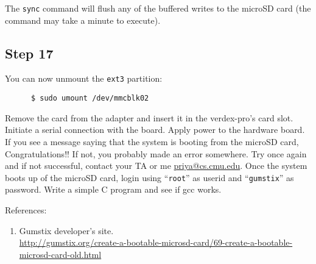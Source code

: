 \documentclass{article}
\begin{document}
      The \texttt{sync} command will flush any of the buffered writes to the
      microSD card (the command may take a minute to execute).
   \subsection*{Step 17}
      You can now unmount the \texttt{ext3} partition: 
      \begin{verbatim}
      $ sudo umount /dev/mmcblk02 
      \end{verbatim}

      Remove the card from the adapter and insert it in the verdex-pro’s card
      slot. Initiate a serial connection with the board. Apply power to the
      hardware board. If you see a message saying that the system is booting
      from the microSD card, Congratulations!! If not, you probably made an
      error somewhere. Try once again and if not successful, contact your TA or
      me \url{priya@cs.cmu.edu}. Once the system boots up of the microSD
      card, login using “\texttt{root}” as userid and “\texttt{gumstix}” as
      password. Write a simple C program and see if gcc works.  

      References: 
      \begin{enumerate}
      \item Gumstix developer’s site.\\
        \url{http://gumstix.org/create-a-bootable-microsd-card/69-create-a-bootable-microsd-card-old.html}
      \end{enumerate}
\end{document}
